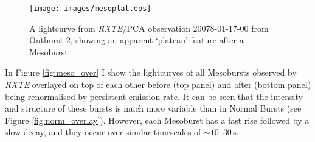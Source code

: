 \begin{figure}
  \centering
  \texttt{[image: images/mesoplat.eps]}
  \caption[A lightcurve from \textit{RXTE} observation 20078-01-17-00 from Outburst 2, showing an apparent `plateau' feature after a Mesoburst.]{\small A lightcurve from \indexpca\textit{RXTE}/PCA observation 20078-01-17-00 from Outburst 2, showing an apparent `plateau' feature after a Mesoburst.}
  \label{fig:mesoplateau}
\end{figure}

\par In Figure \ref{fig:meso_over} I show the lightcurves of all Mesobursts observed by \indexrxte\textit{RXTE} overlayed on top of each other before (top panel) and after (bottom panel) being renormalised by persistent emission rate.  It can be seen that the intensity and structure of these bursts is much more variable than in Normal Bursts (see Figure \ref{fig:norm_overlay}).  However, each Mesoburst has a fast rise followed by a slow decay, and they occur over similar timescales of $\sim10$--$30$\,s.

